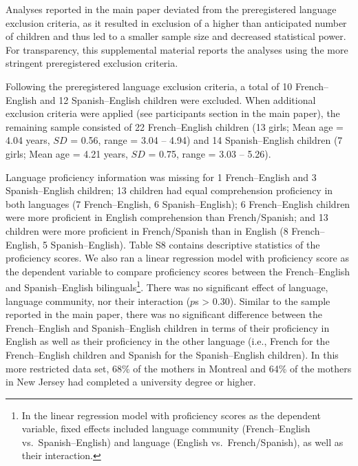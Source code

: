 \documentclass[
  man,floatsintext]{apa7}
\begin{document}
Analyses reported in the main paper deviated from the preregistered language exclusion criteria, as it resulted in exclusion of a higher than anticipated number of children and thus led to a smaller sample size and decreased statistical power. For transparency, this supplemental material reports the analyses using the more stringent preregistered exclusion criteria.

Following the preregistered language exclusion criteria, a total of 10 French--English and 12 Spanish--English children were excluded. When additional exclusion criteria were applied (see participants section in the main paper), the remaining sample consisted of 22 French--English children (13 girls; Mean age = 4.04 years, \(SD\) = 0.56, range = 3.04 -- 4.94) and 14 Spanish--English children (7 girls; Mean age = 4.21 years, \(SD\) = 0.75, range = 3.03 -- 5.26).

Language proficiency information was missing for 1 French--English and 3 Spanish--English children; 13 children had equal comprehension proficiency in both languages (7 French--English, 6 Spanish--English); 6 French--English children were more proficient in English comprehension than French/Spanish; and 13 children were more proficient in French/Spanish than in English (8 French--English, 5 Spanish--English). Table S8 contains descriptive statistics of the proficiency scores. We also ran a linear regression model with proficiency score as the dependent variable to compare proficiency scores between the French--English and Spanish--English bilinguals\footnote{In the linear regression model with proficiency scores as the dependent variable, fixed effects included language community (French--English vs.~Spanish--English) and language (English vs.~French/Spanish), as well as their interaction.}. There was no significant effect of language, language community, nor their interaction (\(p\)s \textgreater{} 0.30). Similar to the sample reported in the main paper, there was no significant difference between the French--English and Spanish--English children in terms of their proficiency in English as well as their proficiency in the other language (i.e., French for the French--English children and Spanish for the Spanish--English children). In this more restricted data set, 68\% of the mothers in Montreal and 64\% of the mothers in New Jersey had completed a university degree or higher.
\end{document}

